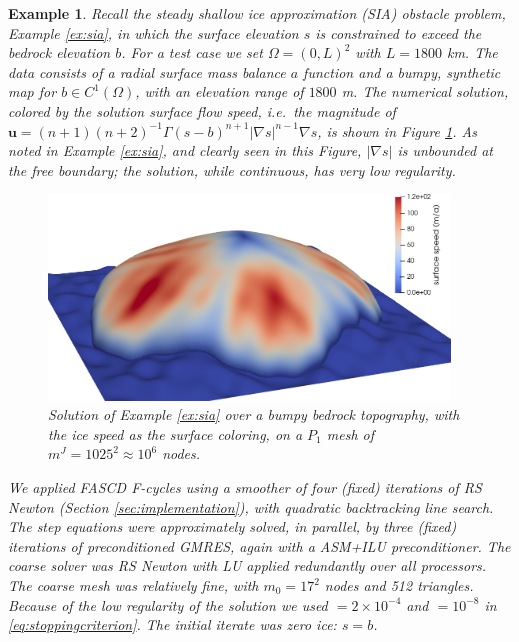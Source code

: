\documentclass[letterpaper,final,12pt,reqno]{amsart}
\theoremstyle{cstyle}
\theoremstyle{cstyle*}
\theoremstyle{dstyle}
\newtheorem{example}[theorem]{Example}
\numberwithin{equation}{section}
\numberwithin{figure}{section}
\numberwithin{table}{section}
\numberwithin{theorem}{section}
\newcommand{\grad}{\nabla}
\begin{document}
\begin{example}   \label{ex:results:sia}
Recall the steady shallow ice approximation (SIA) obstacle problem, Example \ref{ex:sia}, in which the surface elevation $s$ is constrained to exceed the bedrock elevation $b$.  For a test case we set $\Omega=(0,L)^2$ with $L=1800$ km.  The data consists of a radial surface mass balance $a$ function \cite[equation (5.122)]{GreveBlatter2009} and a bumpy, synthetic map for $b\in C^1(\Omega)$, with an elevation range of $1800$ m.  The numerical solution, colored by the solution surface flow speed, i.e.~the magnitude of $\mathbf{u} = (n+1)(n+2)^{-1} \Gamma (s-b)^{n+1} |\grad s|^{n-1} \grad s$, is shown in Figure \ref{fig:results:siascene}.  As noted in Example \ref{ex:sia}, and clearly seen in this Figure, $|\grad s|$ is unbounded at the free boundary; the solution, while continuous, has very low regularity.

\begin{figure}[ht]
\begin{center}
\includegraphics[width=0.95\textwidth]{fixfigs/sialev8scene.png}
\end{center}
\caption{Solution of Example \ref{ex:sia} over a bumpy bedrock topography, with the ice speed as the surface coloring, on a $P_1$ mesh of $m^J=1025^2 \approx 10^6$ nodes.}
\label{fig:results:siascene}
\end{figure}

We applied FASCD F-cycles using a smoother of four (fixed) iterations of RS Newton (Section \ref{sec:implementation}), with quadratic backtracking line search.  The step equations were approximately solved, in parallel, by three (fixed) iterations of preconditioned GMRES, again with a ASM+ILU preconditioner.  The coarse solver was RS Newton with LU applied redundantly over all processors.  The coarse mesh was relatively fine, with $m_0=17^2$ nodes and 512 triangles.  Because of the low regularity of the solution we used  $= 2 \times 10^{-4}$ and  $= 10^{-8}$ in \eqref{eq:stoppingcriterion}.  The initial iterate was zero ice: $s=b$.


\end{example}
\end{document}
